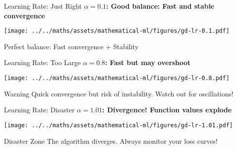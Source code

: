 \documentclass[usenames,dvipsnames]{beamer}
\begin{document}
  \begin{frame}{Learning Rate: Just Right}
    \textbf{$\alpha = 0.1$: Good balance: Fast and stable convergence}
    \begin{center}
    \texttt{[image: ../../maths/assets/mathematical-ml/figures/gd-lr-0.1.pdf]}
    \end{center}
    
    \begin{keypointsbox}{}
    Perfect balance: Fast convergence + Stability
    \end{keypointsbox}
  \end{frame}

  \begin{frame}{Learning Rate: Too Large}
    \textbf{$\alpha = 0.8$: Fast but may overshoot}
    \begin{center}
    \texttt{[image: ../../maths/assets/mathematical-ml/figures/gd-lr-0.8.pdf]}
    \end{center}
    
    \footnotesize
    \begin{alertbox}{Warning}
    Quick convergence but risk of instability. Watch out for oscillations!
    \end{alertbox}
  \end{frame}

  \begin{frame}{Learning Rate: Disaster}
    \textbf{$\alpha = 1.01$: Divergence! Function values explode}
    \begin{center}
    \texttt{[image: ../../maths/assets/mathematical-ml/figures/gd-lr-1.01.pdf]}
    \end{center}
    
    \begin{alertbox}{Disaster Zone}
    The algorithm diverges. Always monitor your loss curves!
    \end{alertbox}
  \end{frame}
\end{document}
